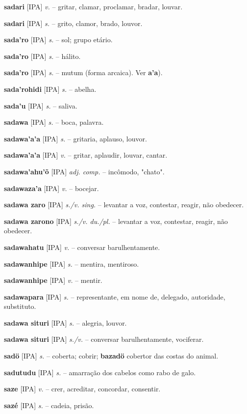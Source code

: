 \textbf{sadari} [IPA] \textit{v.} -- gritar, clamar, proclamar, bradar, louvar.

\textbf{sadari} [IPA] \textit{s.} -- grito, clamor, brado, louvor.

\textbf{sada'ro} [IPA] \textit{s.} -- sol; grupo etário.

\textbf{sada'ro} [IPA] \textit{s.} -- hálito.

\textbf{sada'ro} [IPA] \textit{s.} -- mutum (forma arcaica). Ver \textbf{a'a}).

\textbf{sada'rohidi} [IPA] \textit{s.} -- abelha.

\textbf{sada'u} [IPA] \textit{s.} -- saliva.

\textbf{sadawa} [IPA] \textit{s.} -- boca, palavra.

\textbf{sadawa'a'a} [IPA] \textit{s.} -- gritaria, aplauso, louvor.

\textbf{sadawa'a'a} [IPA] \textit{v.} -- gritar, aplaudir, louvar, cantar.

\textbf{sadawa'ahu'õ} [IPA] \textit{adj. comp.} -- incômodo, "chato".

\textbf{sadawaza'a} [IPA] \textit{v.} -- bocejar.

\textbf{sadawa zaro} [IPA] \textit{s./v. sing.} -- levantar a voz, contestar, reagir, não obedecer.

\textbf{sadawa zarono} [IPA] \textit{s./v. du./pl.} -- levantar a voz, contestar, reagir, não obedecer.

\textbf{sadawahatu} [IPA] \textit{v.} -- conversar barulhentamente.

\textbf{sadawanhipe} [IPA] \textit{s.} -- mentira, mentiroso.

\textbf{sadawanhipe} [IPA] \textit{v.} -- mentir.

\textbf{sadawapara} [IPA] \textit{s.} -- representante, em nome de, delegado, autoridade, substituto.

\textbf{sadawa situri} [IPA] \textit{s.} -- alegria, louvor.

\textbf{sadawa situri} [IPA] \textit{s./v.} -- conversar barulhentamente, vociferar.

\textbf{sadö} [IPA] \textit{s.} -- coberta; cobrir; \textbf{bazadö} cobertor das costas do animal.

\textbf{sadutudu} [IPA] \textit{s.} -- amarração dos cabelos como rabo de galo.

\textbf{saze} [IPA] \textit{v.} -- crer, acreditar, concordar, consentir.

\textbf{sazé} [IPA] \textit{s.} -- cadeia, prisão.

